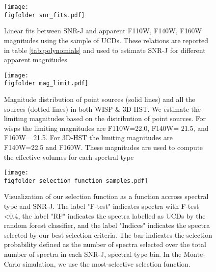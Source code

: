\begin{figure}
    \centering
    \texttt{[image: \\figfolder snr\_fits.pdf]}
    \caption{Linear fits between SNR-J and apparent F110W, F140W, F160W magnitudes using the sample of UCDs. These relations are reported in table \ref{tab:polynomials} and used to estimate SNR-J for different apparent magnitudes}
    \label{fig:snrfits}
\end{figure}

\begin{figure}
    \centering
    \texttt{[image: \\figfolder mag\_limit.pdf]}
    \caption{Magnitude distribution of point sources (solid lines) and all the sources (dotted lines) in both WISP \& 3D-HST. We estimate the limiting magnitudes based on the distribution of point sources. For wisps the limiting magnitudes are F110W=22.0, F140W= 21.5, and F160W= 21.5. For 3D-HST the limiting magnitudes are F140W=22.5 and F160W. These magnitudes are used to compute the effective volumes for each spectral type}
    \label{fig:maglimit}
\end{figure}


\begin{figure}
    \centering
    \texttt{[image: \\figfolder selection\_function\_samples.pdf]}
    \caption{Visualization of our selection function as a function accross spectral type and SNR-J. The label "F-test" indicates spectra with F-test \textless 0.4, the label "RF" indicates the spectra labelled as UCDs by the random forest classifier, and the label "Indices" indicates the spectra selected by our best selection criteria. The bar indicates the selection probability defined as the number of spectra selected over the total number of spectra in each SNR-J, spectral type bin. In the Monte-Carlo simulation, we use the most-selective selection function. }
    \label{fig:selectionf}
\end{figure}




